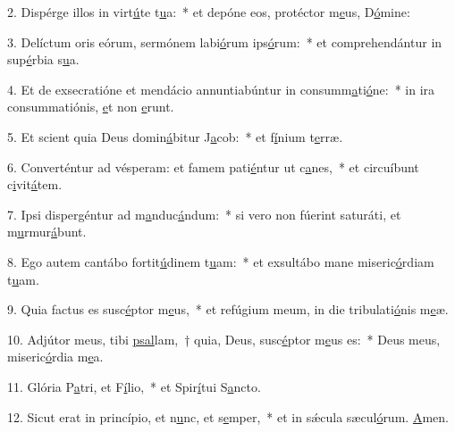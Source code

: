 2. Dispérge illos in virt\uline{ú}te t\uline{u}a:~* et depóne eos, protéctor m\uline{e}us, D\uline{ó}mine:\par 
3. Delíctum oris eórum, sermónem labi\uline{ó}rum ips\uline{ó}rum:~* et comprehendántur in sup\uline{é}rbia s\uline{u}a.\par 
4. Et de exsecratióne et mendácio annuntiabúntur in consumm\uline{a}ti\uline{ó}ne:~* in ira consummatiónis, \uline{e}t non \uline{e}runt.\par 
5. Et scient quia Deus domin\uline{á}bitur J\uline{a}cob:~* et f\uline{í}nium t\uline{e}rræ.\par 
6. Converténtur ad vésperam: et famem pati\uline{é}ntur ut c\uline{a}nes,~* et circuíbunt c\uline{i}vit\uline{á}tem.\par 
7. Ipsi dispergéntur ad m\uline{a}nduc\uline{á}ndum:~* si vero non fúerint saturáti, et m\uline{u}rmur\uline{á}bunt.\par 
8. Ego autem cantábo fortit\uline{ú}dinem t\uline{u}am:~* et exsultábo mane miseric\uline{ó}rdiam t\uline{u}am.\par 
9. Quia factus es susc\uline{é}ptor m\uline{e}us,~* et refúgium meum, in die tribulati\uline{ó}nis m\uline{e}æ.\par 
10. Adjútor meus, tibi \uline{psal}lam,~† quia, Deus, susc\uline{é}ptor m\uline{e}us es:~* Deus meus, miseric\uline{ó}rdia m\uline{e}a.\par 
11. Glória P\uline{a}tri, et F\uline{í}lio,~* et Spir\uline{í}tui S\uline{a}ncto.\par 
12. Sicut erat in princípio, et n\uline{u}nc, et s\uline{e}mper,~* et in sǽcula sæcul\uline{ó}rum. \uline{A}men.\par 
